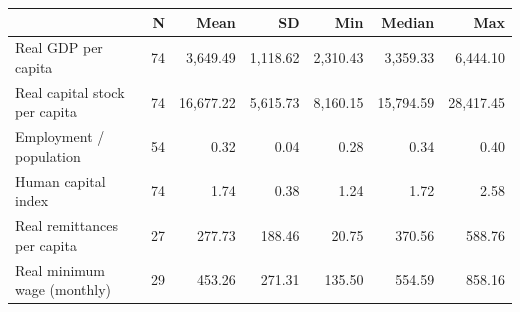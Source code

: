 \begin{tabular}{l*{6}{r}}
\toprule
                    &           N&        Mean&          SD&         Min&      Median&         Max\\
\midrule
Real GDP per capita &          74&    3,649.49&    1,118.62&    2,310.43&    3,359.33&    6,444.10\\
Real capital stock per capita&          74&   16,677.22&    5,615.73&    8,160.15&   15,794.59&   28,417.45\\
Employment / population&          54&        0.32&        0.04&        0.28&        0.34&        0.40\\
Human capital index &          74&        1.74&        0.38&        1.24&        1.72&        2.58\\
Real remittances per capita&          27&      277.73&      188.46&       20.75&      370.56&      588.76\\
Real minimum wage (monthly)&          29&      453.26&      271.31&      135.50&      554.59&      858.16\\
\bottomrule
\end{tabular}
